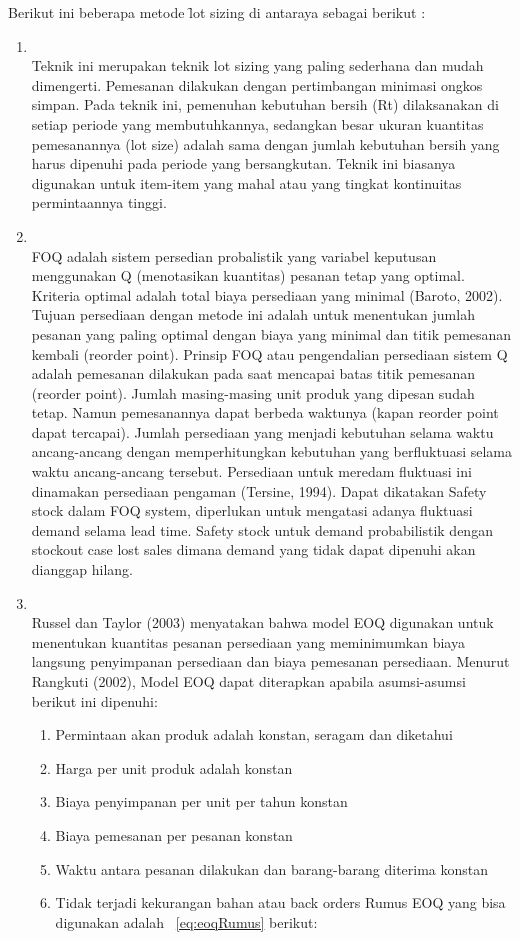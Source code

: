 Berikut ini beberapa metode \f{lot sizing} di antaraya sebagai berikut \cite{Almahdy}:
\begin{enumerate}
	\item {}\\
	Teknik ini merupakan teknik lot sizing yang paling sederhana dan mudah dimengerti. Pemesanan dilakukan dengan pertimbangan minimasi ongkos simpan. Pada teknik ini, pemenuhan kebutuhan bersih (Rt) dilaksanakan di setiap periode yang membutuhkannya, sedangkan besar ukuran kuantitas pemesanannya (lot size) adalah sama dengan jumlah kebutuhan bersih yang harus dipenuhi pada periode yang bersangkutan. Teknik ini biasanya digunakan untuk item-item yang mahal atau yang tingkat kontinuitas permintaannya tinggi.
	
	\item {}\\
	FOQ adalah sistem persedian probalistik yang variabel keputusan menggunakan Q (menotasikan kuantitas) pesanan tetap yang optimal. Kriteria optimal adalah total biaya persediaan yang minimal (Baroto, 2002). Tujuan persediaan dengan metode ini adalah untuk menentukan jumlah pesanan yang paling optimal dengan biaya yang minimal dan titik pemesanan kembali (reorder point). Prinsip FOQ atau pengendalian persediaan sistem Q adalah pemesanan dilakukan pada saat mencapai batas titik pemesanan (reorder point). Jumlah masing-masing unit produk yang dipesan sudah tetap. Namun pemesanannya dapat berbeda waktunya (kapan reorder point dapat tercapai). Jumlah persediaan yang menjadi kebutuhan selama waktu ancang-ancang dengan memperhitungkan kebutuhan yang berfluktuasi selama waktu ancang-ancang tersebut. Persediaan untuk meredam fluktuasi ini dinamakan persediaan pengaman (Tersine, 1994). Dapat dikatakan Safety stock dalam FOQ system, diperlukan untuk mengatasi adanya fluktuasi demand selama lead time. Safety stock untuk demand probabilistik dengan stockout case lost sales dimana demand yang tidak dapat dipenuhi akan dianggap hilang.
	
	\item {}\\
	Russel dan Taylor (2003) menyatakan bahwa model EOQ digunakan untuk menentukan kuantitas pesanan persediaan yang meminimumkan biaya langsung penyimpanan persediaan dan biaya pemesanan persediaan. Menurut Rangkuti (2002), Model EOQ dapat diterapkan apabila asumsi-asumsi berikut ini dipenuhi:
	
	\begin{enumerate}
		\item Permintaan akan produk adalah konstan, seragam dan diketahui
		\item Harga per unit produk adalah konstan
		\item Biaya penyimpanan per unit per tahun konstan
		\item Biaya pemesanan per pesanan konstan
		\item Waktu antara pesanan dilakukan dan barang-barang diterima konstan
		\item Tidak terjadi kekurangan bahan atau back orders Rumus EOQ yang bisa digunakan adalah \equ~\ref{eq:eoqRumus} berikut:
		

\end{enumerate}
\end{enumerate}
